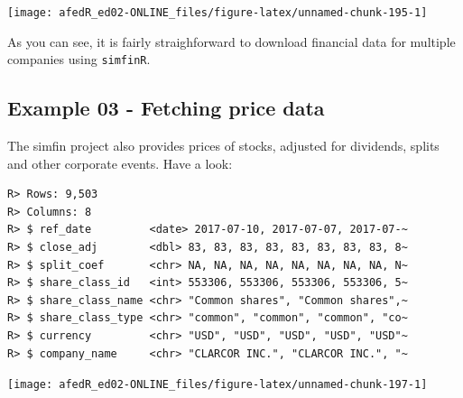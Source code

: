 \documentclass[
  12pt,
]{book}
\newenvironment{Shaded}{\begin{snugshade}}{\end{snugshade}}
\newcommand{\AttributeTok}[1]{\textcolor[rgb]{0.61,0.61,0.61}{#1}}
\newcommand{\DecValTok}[1]{\textcolor[rgb]{0.06,0.06,0.06}{#1}}
\newcommand{\FunctionTok}[1]{\textcolor[rgb]{0,0,0}{#1}}
\newcommand{\NormalTok}[1]{#1}
\newcommand{\OtherTok}[1]{\textcolor[rgb]{0.37,0.37,0.37}{#1}}
\newcommand{\SpecialCharTok}[1]{\textcolor[rgb]{0,0,0}{#1}}
\begin{document}
\begin{center}\texttt{[image: afedR\_ed02-ONLINE\_files/figure-latex/unnamed-chunk-195-1]} \end{center}

As you can see, it is fairly straighforward to download financial data for multiple companies using \texttt{simfinR}.

\hypertarget{example-03---fetching-price-data}{%
\subsection{Example 03 - Fetching price data}\label{example-03---fetching-price-data}}

The simfin project also provides prices of stocks, adjusted for dividends, splits and other corporate events. Have a look:

\begin{Shaded}
\end{Shaded}

\begin{verbatim}
R> Rows: 9,503
R> Columns: 8
R> $ ref_date         <date> 2017-07-10, 2017-07-07, 2017-07-~
R> $ close_adj        <dbl> 83, 83, 83, 83, 83, 83, 83, 83, 8~
R> $ split_coef       <chr> NA, NA, NA, NA, NA, NA, NA, NA, N~
R> $ share_class_id   <int> 553306, 553306, 553306, 553306, 5~
R> $ share_class_name <chr> "Common shares", "Common shares",~
R> $ share_class_type <chr> "common", "common", "common", "co~
R> $ currency         <chr> "USD", "USD", "USD", "USD", "USD"~
R> $ company_name     <chr> "CLARCOR INC.", "CLARCOR INC.", "~
\end{verbatim}

\begin{center}\texttt{[image: afedR\_ed02-ONLINE\_files/figure-latex/unnamed-chunk-197-1]} \end{center}
\end{document}
